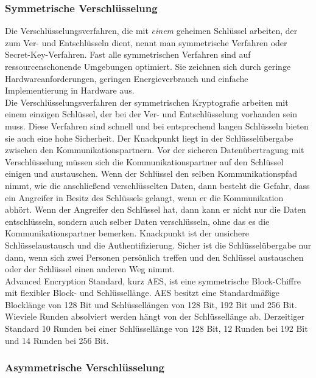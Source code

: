 \documentclass[letterpaper, 12pt]{article}
\let\tempsubsubsection\subsubsection
\renewcommand\subsubsection[1]{\vspace{0cm}\tempsubsubsection{#1}\vspace{0cm}}
\begin{document}
\subsubsection{Symmetrische Verschlüsselung}
Die Verschlüsselungsverfahren, die mit \textit{einem} geheimen Schlüssel arbeiten, der zum Ver- und Entschlüsseln dient, nennt man symmetrische Verfahren oder Secret-Key-Verfahren. Fast alle symmetrischen Verfahren sind auf ressourcenschonende Umgebungen optimiert. Sie zeichnen sich durch geringe Hardwareanforderungen, geringen Energieverbrauch und einfache Implementierung in Hardware aus. \\
Die Verschlüsselungsverfahren der symmetrischen Kryptografie arbeiten mit einem einzigen Schlüssel, der bei der Ver- und Entschlüsselung vorhanden sein muss. Diese Verfahren sind schnell und bei entsprechend langen Schlüsseln bieten sie auch eine hohe Sicherheit.
Der Knackpunkt liegt in der Schlüsselübergabe zwischen den Kommunikationspartnern. Vor der sicheren Datenübertragung mit Verschlüsselung müssen sich die Kommunikationspartner auf den Schlüssel einigen und austauschen. Wenn der Schlüssel den selben Kommunikationspfad nimmt, wie die anschließend verschlüsselten Daten, dann besteht die Gefahr, dass ein Angreifer in Besitz des Schlüssels gelangt, wenn er die Kommunikation abhört. Wenn der Angreifer den Schlüssel hat, dann kann er nicht nur die Daten entschlüsseln, sondern auch selber Daten verschlüsseln, ohne das es die Kommunikationspartner bemerken. Knackpunkt ist der unsichere Schlüsselaustausch und die Authentifizierung.
Sicher ist die Schlüsselübergabe nur dann, wenn sich zwei Personen persönlich treffen und den Schlüssel austauschen oder der Schlüssel einen anderen Weg nimmt. \\
Advanced Encryption Standard, kurz AES, ist eine symmetrische Block-Chiffre mit flexibler Block- und Schlüssellänge.
AES besitzt eine Standardmäßige Blocklänge von 128 Bit und Schlüssellängen
von 128 Bit, 192 Bit und 256 Bit. Wieviele Runden absolviert werden hängt von der
Schlüssellänge ab. Derzeitiger Standard 10 Runden bei einer Schlüssellänge von 128 Bit,
12 Runden bei 192 Bit und 14 Runden bei 256 Bit. \cite{ausarbeitungsec}

\subsubsection{Asymmetrische Verschlüsselung}
\end{document}
